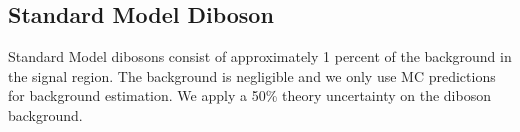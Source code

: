 \subsection{Standard Model Diboson}
\label{sec:Bkg:diboson}

\indent Standard Model dibosons consist of approximately 1 percent of the background in the signal region.  The background is negligible and we only use MC predictions for background estimation. We apply a 50\% theory uncertainty on the diboson background. \\